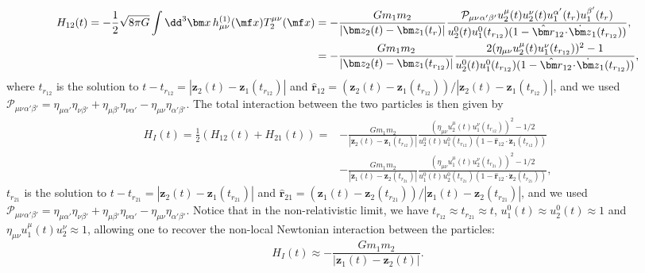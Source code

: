 {\begin{align}
    {H}_{12}(t)  = - \frac{1}{2} \sqrt{8\pi G} \int \dd^3 {\bm x}\, h^{(1)}_{\mu\nu}(\mf x) T_2^{\mu\nu}(\mf x) &=- \frac{G m_1 m_2}{|\bm z_2(t) - \bm z_1(t_r)|} \frac{\mathcal{P}_{\mu\nu}{}_{\alpha'\beta'}u_2^{\mu}(t) u_2^{\nu}(t)u_1^{\alpha'}(t_r) u_1^{\beta'}(t_r)}{u_2^0(t)u_1^0(t_{r_{12}})(1- \hat{\bm r}_{12}\!\cdot\! \dot{\bm z}_1(t_{r_{12}}))},\nonumber\\
    &=- \frac{G m_1 m_2}{|\bm z_2(t) - \bm z_1(t_{r_{12}})|} \frac{2(\eta_{\mu\nu}u_2^{\mu}(t) u_1^{\nu}(t_{r_{12}}))^2-1}{u_2^0(t)u_1^0(t_{r_{12}})(1- \hat{\bm r}_{12}\!\cdot\! \dot{\bm z}_1(t_{r_{12}}))},
\end{align}
where $t_{r_{12}}$ is the solution to $t - t_{r_{12}} = |\bm z_2(t) - \bm z_1(t_{r_{12}})|$ and $\hat{\bm r}_{12} = (\bm z_2(t)  - \bm z_1(t_{r_{12}}))/|\bm z_2(t)  - \bm z_1(t_{r_{12}})|$, and we used $\mathcal{P}_{\mu\nu}{}_{\alpha'\beta'} = \eta_{\mu\alpha'}\eta_{\nu \beta'} + \eta_{\mu \beta'} \eta_{\nu \alpha'} - \eta_{\mu\nu} \eta_{\alpha'\beta'}$. The total interaction between the two particles is then given by
\begin{align}
    H_I(t) = \frac{1}{2}\left(H_{12}(t) + H_{21}(t)\right) =&- \frac{G m_1 m_2}{|\bm z_2(t) - \bm z_1(t_{r_{12}})|}\frac{(\eta_{\mu\nu}u_2^{\mu}(t) u_1^{\nu}(t_{r_{12}}))^2-1/2}{u_2^0(t)u_1^0(t_{r_{12}})(1- \hat{\bm r}_{12}\!\cdot\! \dot{\bm z}_1(t_{r_{12}}))}\\&- \frac{G m_1 m_2}{|\bm z_1(t) - \bm z_2(t_{r_{21}})|} \frac{(\eta_{\mu\nu}u_1^{\mu}(t) u_2^{\nu}(t_{r_{21}}))^2-1/2}{u_1^0(t)u_2^0(t_{r_{21}})(1- \hat{\bm r}_{12}\!\cdot\! \dot{\bm z}_2(t_{r_{21}}))},
\end{align}
$t_{r_{21}}$ is the solution to $t - t_{r_{21}} = |\bm z_2(t) - \bm z_1(t_{r_{21}})|$ and $\hat{\bm r}_{21} = (\bm z_1(t)  - \bm z_2(t_{r_{21}}))/|\bm z_1(t)  - \bm z_2(t_{r_{21}})|$, and we used $\mathcal{P}_{\mu\nu}{}_{\alpha'\beta'} = \eta_{\mu\alpha'}\eta_{\nu \beta'} + \eta_{\mu \beta'} \eta_{\nu \alpha'} - \eta_{\mu\nu} \eta_{\alpha'\beta'}$.
Notice that in the non-relativistic limit, we have $t_{r_{12}}\approx t_{r_{21}} \approx t$, $u_1^0(t) \approx u_2^0(t) \approx 1$ and $\eta_{\mu\nu} u_1^\mu(t)u_2^\nu \approx 1$, allowing one to recover the non-local Newtonian interaction between the particles:
\begin{equation}
    H_I(t)\approx - \frac{G m_1 m_2}{|\bm z_1(t) - \bm z_2(t)|}.
\end{equation}


}
